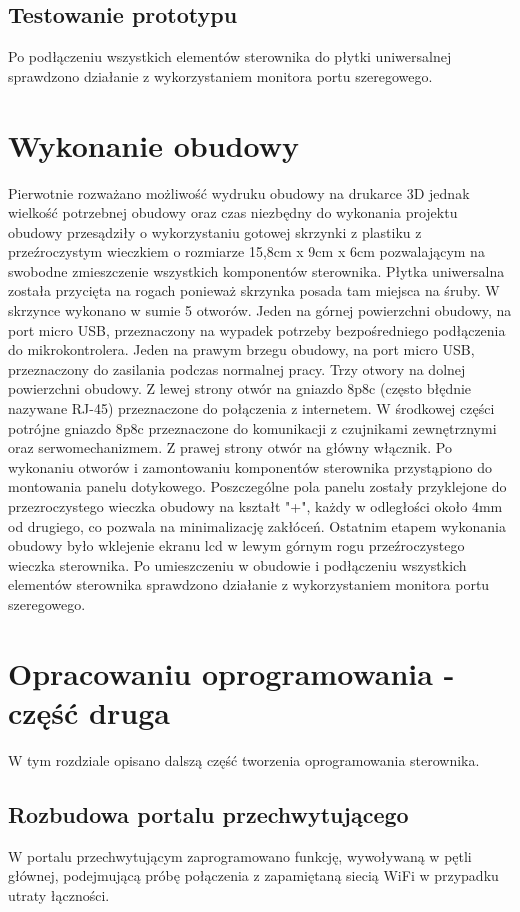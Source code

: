 \documentclass[11pt]{report}
\begin{document}
 \section{Testowanie prototypu}
 Po podłączeniu wszystkich elementów sterownika do płytki uniwersalnej sprawdzono działanie z wykorzystaniem monitora portu szeregowego.
 
 \chapter{Wykonanie obudowy}
 Pierwotnie rozważano możliwość wydruku obudowy na drukarce 3D \cite{Frence2014} jednak wielkość potrzebnej obudowy oraz czas niezbędny do wykonania projektu obudowy przesądziły o wykorzystaniu gotowej skrzynki z plastiku z przeźroczystym wieczkiem o rozmiarze 15,8cm x 9cm x 6cm pozwalającym na swobodne zmieszczenie wszystkich komponentów sterownika. Płytka uniwersalna została przycięta na rogach ponieważ skrzynka posada tam miejsca na śruby. W skrzynce wykonano w sumie 5 otworów. Jeden na górnej powierzchni obudowy, na port micro USB, przeznaczony na wypadek potrzeby bezpośredniego podłączenia do mikrokontrolera. Jeden na prawym brzegu obudowy, na port micro USB, przeznaczony do zasilania podczas normalnej pracy. Trzy otwory na dolnej powierzchni obudowy. Z lewej strony otwór na gniazdo 8p8c (często błędnie nazywane RJ-45) przeznaczone do połączenia z internetem. W środkowej części potrójne gniazdo 8p8c przeznaczone do komunikacji z czujnikami zewnętrznymi oraz serwomechanizmem. Z prawej strony otwór na główny włącznik.
 Po wykonaniu otworów i zamontowaniu komponentów sterownika przystąpiono do montowania panelu dotykowego. Poszczególne pola panelu zostały przyklejone do przezroczystego wieczka obudowy na kształt "+", każdy w odległości około 4mm od drugiego, co pozwala na minimalizację zakłóceń.
 Ostatnim etapem wykonania obudowy było wklejenie ekranu lcd w lewym górnym rogu przeźroczystego wieczka sterownika.
 Po umieszczeniu w obudowie i podłączeniu wszystkich elementów sterownika sprawdzono działanie z wykorzystaniem monitora portu szeregowego.
 
 \chapter{Opracowaniu oprogramowania - część druga}\label{prog:2}
 W tym rozdziale opisano dalszą część tworzenia oprogramowania sterownika. 

  \section{Rozbudowa portalu przechwytującego}
  W portalu przechwytującym zaprogramowano funkcję, wywoływaną w pętli głównej, podejmującą próbę połączenia z zapamiętaną siecią WiFi w przypadku utraty łączności.
  
\end{document}
